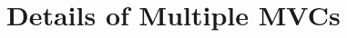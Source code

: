 \documentclass[11pt]{article}
\newcommand{\Rfunction}[1]{{\textsf{#1}}}
\newcommand{\Rclass}[1]{\texttt{#1}}
\begin{document}




\section{Details of Multiple MVCs}
\label{Sec:MultMVC}
\end{document}
